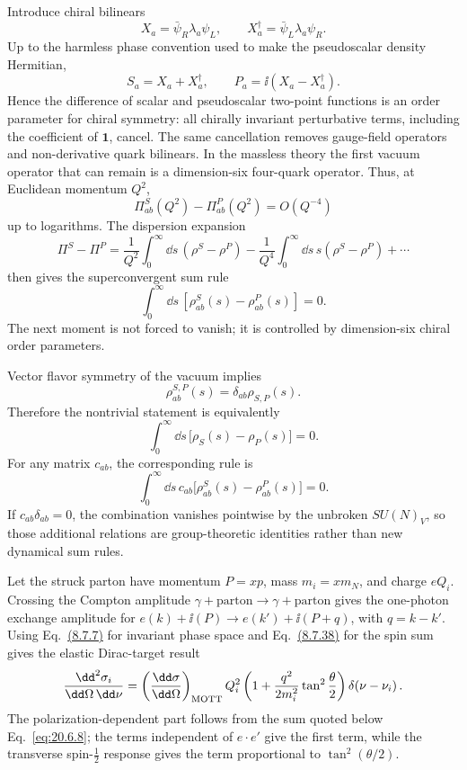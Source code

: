 \begin{enumerate}
  Introduce chiral bilinears
  \[
    X_a=\bar\psi_R\lambda_a\psi_L,\qquad
    X_a^\dagger=\bar\psi_L\lambda_a\psi_R.
  \]
  Up to the harmless phase convention used to make the pseudoscalar
  density Hermitian,
  \[
    S_a=X_a+X_a^\dagger,\qquad
    P_a=\ii(X_a-X_a^\dagger).
  \]
  Hence the difference of scalar and pseudoscalar two-point functions is
  an order parameter for chiral symmetry: all chirally invariant
  perturbative terms, including the coefficient of \(\mathbf{1}\), cancel.
  The same cancellation removes gauge-field operators and
  non-derivative quark bilinears.  In the massless theory the first
  vacuum operator that can remain is a dimension-six four-quark
  operator.  Thus, at Euclidean momentum \(Q^2\),
  \[
    \Pi_{ab}^{S}(Q^2)
      -\Pi_{ab}^{P}(Q^2)
      =O(Q^{-4})
  \]
  up to logarithms.  The dispersion expansion
  \[
    \Pi^S-\Pi^P
      =\frac1{Q^2}\int_0^\infty \dd s\,(\rho^S-\rho^P)
       -\frac1{Q^4}\int_0^\infty \dd s\,s(\rho^S-\rho^P)
       +\cdots
  \]
  then gives the superconvergent sum rule
  \[
    \boxed{\int_0^\infty \dd s\,
      \left[\rho_{ab}^{S}(s)
            -\rho_{ab}^{P}(s)\right]=0.}
  \]
  The next moment is not forced to vanish; it is controlled by
  dimension-six chiral order parameters.

  Vector flavor symmetry of the vacuum implies
  \[
    \rho_{ab}^{S,P}(s)
      =\delta_{ab}\rho_{S,P}(s).
  \]
  Therefore the nontrivial statement is equivalently
  \[
    \int_0^\infty \dd s\,\bigl[\rho_S(s)-\rho_P(s)\bigr]=0.
  \]
  For any matrix \(c_{ab}\), the corresponding rule is
  \[
    \int_0^\infty \dd s\,c_{ab}
    \bigl[\rho_{ab}^{S}(s)
          -\rho_{ab}^{P}(s)\bigr]=0.
  \]
  If \(c_{ab}\delta_{ab}=0\), the combination vanishes
  pointwise by the unbroken \(SU(N)_V\), so those additional relations are
  group-theoretic identities rather than new dynamical sum rules.

  Let the struck parton have momentum \(P=xp\), mass
  \(m_i=xm_N\), and charge \(eQ_i\).  Crossing the Compton amplitude
  \(\gamma+\text{parton}\to\gamma+\text{parton}\) gives the one-photon
  exchange amplitude for
  \(e(k)+\ii(P)\to e(k')+\ii(P+q)\), with \(q=k-k'\).
  Using Eq.~\hyperref[eq:8.7.7]{(8.7.7)} for invariant phase space and
  Eq.~\hyperref[eq:8.7.38]{(8.7.38)} for the spin sum gives the elastic
  Dirac-target result
  \[
    \frac{\dd^2\sigma_i}{\dd\Omega\,\dd\nu}
      =\left(\frac{\dd\sigma}{\dd\Omega}\right)_{\rm MOTT}
       Q_i^2
       \left(1+\frac{q^2}{2m_i^2}
         \tan^2\frac{\theta}{2}\right)
       \delta\!\left(\nu-\nu_i\right).
  \]
  The polarization-dependent part follows from the sum quoted below
  Eq.~\eqref{eq:20.6.8}; the terms independent of
  \(e\cdot e'\) give the first term, while the transverse spin-\(\tfrac12\)
  response gives the term proportional to
  \(\tan^2(\theta/2)\).


\end{enumerate}
